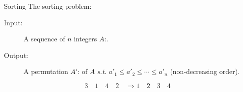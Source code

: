 \begin{frame}{Sorting}
  The sorting problem:
  \begin{description}
	\item[Input:] A sequence of $n$ integers $A$:.
	\item[Output:] A permutation $A'$: of $A$ \emph{s.t.} $a'_1 \le a'_2 \le \cdots \le a'_n$ {\small (non-decreasing order)}.
  \end{description}

  \[
	3\quad 1\quad 4\quad 2\quad \Longrightarrow 1\quad 2\quad 3\quad 4
  \]

  \pause
  \vspace{0.50cm}


\end{frame}
